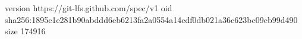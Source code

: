 version https://git-lfs.github.com/spec/v1
oid sha256:1895c1e281b90abddd6eb6213fa2a0554a14cdf0db021a36c623bc09cb99d490
size 174916
